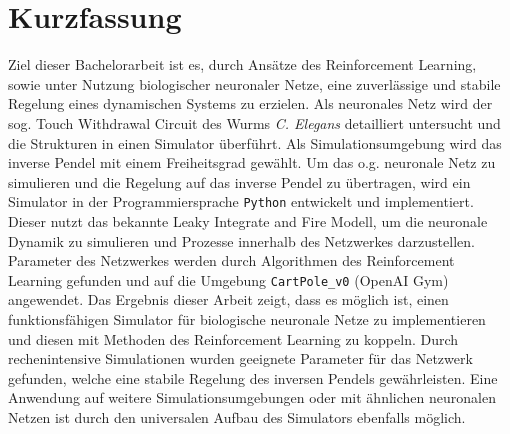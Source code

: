 \section*{Kurzfassung}
%
Ziel dieser Bachelorarbeit ist es, durch Ansätze des Reinforcement Learning, sowie unter Nutzung biologischer neuronaler Netze, eine zuverlässige und stabile Regelung eines dynamischen Systems zu erzielen. Als neuronales Netz wird der sog. \glqq Touch Withdrawal Circuit\grqq{} des Wurms \textit{C. Elegans} detailliert untersucht und die Strukturen in einen Simulator überführt. Als Simulationsumgebung wird das inverse Pendel mit einem Freiheitsgrad gewählt. Um das o.g. neuronale Netz zu simulieren und die Regelung auf das inverse Pendel zu übertragen, wird ein Simulator in der Programmiersprache \texttt{Python} entwickelt und implementiert. Dieser nutzt das bekannte Leaky Integrate and Fire Modell, um die neuronale Dynamik zu simulieren und Prozesse innerhalb des Netzwerkes darzustellen. Parameter des Netzwerkes werden durch Algorithmen des Reinforcement Learning gefunden und auf die Umgebung \texttt{CartPole\_v0} (OpenAI Gym) angewendet. Das Ergebnis dieser Arbeit zeigt, dass es möglich ist, einen funktionsfähigen Simulator für biologische neuronale Netze zu implementieren und diesen mit Methoden des Reinforcement Learning zu koppeln. Durch rechenintensive Simulationen wurden geeignete Parameter für das Netzwerk gefunden, welche eine stabile Regelung des inversen Pendels gewährleisten. Eine Anwendung auf weitere Simulationsumgebungen oder mit ähnlichen neuronalen Netzen ist durch den universalen Aufbau des Simulators ebenfalls möglich.


